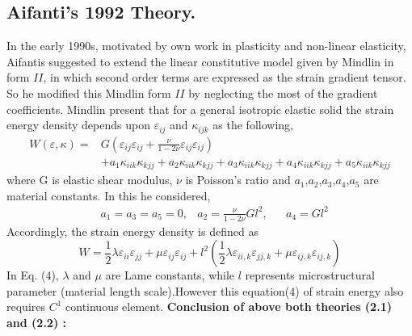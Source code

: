 \documentclass[12pt]{article}
\begin{document}
\subsection{Aifanti's 1992 Theory.} 
In the early 1990s, motivated by own work in plasticity and non-linear elasticity, Aifantis \cite{askes2011gradient} suggested to extend the linear constitutive model given by Mindlin in form $II$, in which second order terms are expressed as the strain gradient tensor. So he modified this Mindlin form $II$ by neglecting the most of the gradient coefficients. Mindlin present that for a general isotropic elastic solid the strain energy density depends upon
$\varepsilon_{ij}$ and $\kappa_{ijk}$ as the following,
\begin{equation}\label{two}
\begin{aligned}
W(\varepsilon,\kappa) = 
& G(\varepsilon_{ij}\varepsilon_{ij}+\frac{\nu}{1-2\nu}\varepsilon_{ij}\varepsilon_{ij}) \\
&    +a_1\kappa_{iik}\kappa_{kjj}+a_2\kappa_{iik}\kappa_{kjj}+a_3\kappa_{iik}\kappa_{kjj}+a_4\kappa_{iik}\kappa_{kjj}+a_5\kappa_{iik}\kappa_{kjj}
\end{aligned}
\end{equation}
where G is elastic shear modulus, $\nu$ is Poisson's ratio and $a_1$,$a_2$,$a_3$,$a_4$,$a_5$ are material constants.   
\newline
In this he considered,
\newline
\begin{equation}
\begin{aligned}
& a_1 = a_3 = a_5 = 0,   &   a_2 = \frac{\nu}{1-2\nu}Gl^2, &&  a_4 = Gl^2
\end{aligned}
\end{equation} 
Accordingly, the strain energy density is defined as
\begin{equation}
W = \frac{1}{2}\lambda\varepsilon_{ii}\varepsilon_{jj}+\mu\varepsilon_{ij}\varepsilon_{ij}+l^2(\frac{1}{2}\lambda\varepsilon_{ii,k}\varepsilon_{jj,k}+\mu\varepsilon_{ij,k}\varepsilon_{ij,k})
\end{equation}
In Eq. (4), $\lambda$ and $\mu$ are Lame constants, while $l$ represents microstructural parameter (material length scale).However this equation(4) of strain energy also requires 
$C^{1}$ continuous element.
\newline
\newline
\textbf{Conclusion of above both theories (2.1) and (2.2) : }
\newline
\newline
\end{document}
